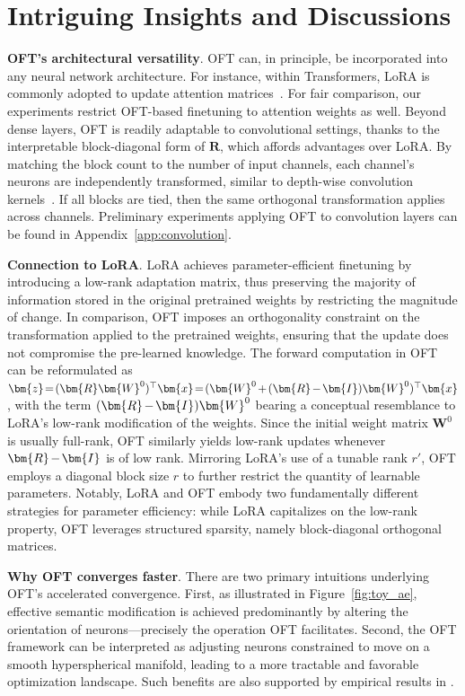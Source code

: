 {\section{Intriguing Insights and Discussions}

\textbf{OFT’s architectural versatility}. OFT can, in principle, be incorporated into any neural network architecture. For instance, within Transformers, LoRA is commonly adopted to update attention matrices~\cite{hulora2022}. For fair comparison, our experiments restrict OFT-based finetuning to attention weights as well. Beyond dense layers, OFT is readily adaptable to convolutional settings, thanks to the interpretable block-diagonal form of $\bm{R}$, which affords advantages over LoRA. By matching the block count to the number of input channels, each channel’s neurons are independently transformed, similar to depth-wise convolution kernels~\cite{chollet2017xception}. If all blocks are tied, then the same orthogonal transformation applies across channels. Preliminary experiments applying OFT to convolution layers can be found in Appendix~\ref{app:convolution}.

\textbf{Connection to LoRA}. LoRA achieves parameter-efficient finetuning by introducing a low-rank adaptation matrix, thus preserving the majority of information stored in the original pretrained weights by restricting the magnitude of change. In comparison, OFT imposes an orthogonality constraint on the transformation applied to the pretrained weights, ensuring that the update does not compromise the pre-learned knowledge. The forward computation in OFT can be reformulated as $\thickmuskip=2mu \medmuskip=2mu \bm{z}=(\bm{R}\bm{W}^0)^\top\bm{x}=(\bm{W}^0+(\bm{R}-\bm{I})\bm{W}^0)^\top\bm{x}$, with the term $\thickmuskip=2mu \medmuskip=2mu (\bm{R}-\bm{I})\bm{W}^0$ bearing a conceptual resemblance to LoRA’s low-rank modification of the weights. Since the initial weight matrix $\bm{W}^0$ is usually full-rank, OFT similarly yields low-rank updates whenever $\thickmuskip=2mu \medmuskip=2mu \bm{R}-\bm{I}$ is of low rank. Mirroring LoRA's use of a tunable rank $r'$, OFT employs a diagonal block size $r$ to further restrict the quantity of learnable parameters. Notably, LoRA and OFT embody two fundamentally different strategies for parameter efficiency: while LoRA capitalizes on the low-rank property, OFT leverages structured sparsity, namely block-diagonal orthogonal matrices.

\textbf{Why OFT converges faster}. There are two primary intuitions underlying OFT’s accelerated convergence. First, as illustrated in Figure~\ref{fig:toy_ae}, effective semantic modification is achieved predominantly by altering the orientation of neurons—precisely the operation OFT facilitates. Second, the OFT framework can be interpreted as adjusting neurons constrained to move on a smooth hyperspherical manifold, leading to a more tractable and favorable optimization landscape. Such benefits are also supported by empirical results in \cite{liu2021orthogonal}.

}
